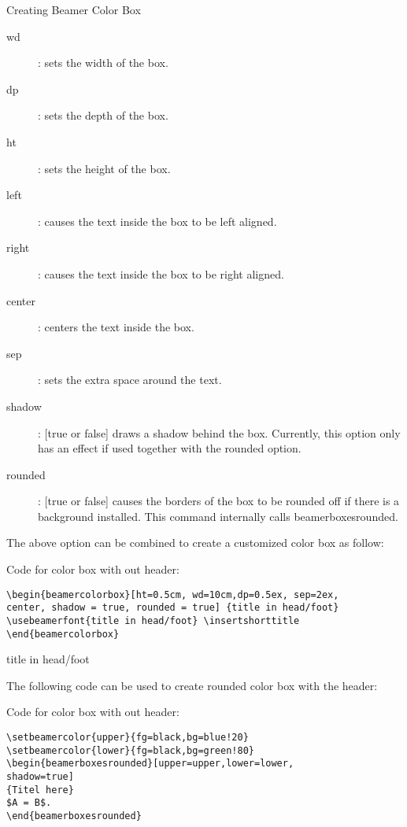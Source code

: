 \documentclass[10pt,xcolor=x11names]{beamer}
\begin{document}
\begin{frame}{Creating Beamer Color Box}
\begin{description}
	\item[wd]: sets the width of the box.
    \item[dp]: sets the depth of the box.
	\item[ht]: sets the height of the box.
	\item[left]: causes the text inside the box to be left aligned.
	\item[right ]: causes the text inside the box to be right aligned.
	\item[center]: centers the text inside the box.
	\item[sep]: sets the extra space around the text.
	\item[shadow]: [true or false] draws a shadow behind the box. Currently, this option only has an effect if used together with the rounded option.
	\item[rounded]: [true or false] causes the borders of the box to be rounded off if there is a background installed. This command internally calls beamerboxesrounded.
\end{description} 
The above option can be combined to create a customized color box as follow: 
\begin{block}{Code for color box with out header:}
\begin{verbatim}
\begin{beamercolorbox}[ht=0.5cm, wd=10cm,dp=0.5ex, sep=2ex, 
center, shadow = true, rounded = true] {title in head/foot}
\usebeamerfont{title in head/foot} \insertshorttitle
\end{beamercolorbox}		
\end{verbatim}
\end{block}

\vspace{10pt}
\begin{beamercolorbox}[ht=1cm,wd=10cm, dp=0.8ex,sep=2ex, center, shadow = true, rounded = true]{title in head/foot}  \insertshorttitle
\end{beamercolorbox}
	
\vspace{95pt}

The following code can be used to create rounded color box with the header:
\begin{block}{Code for color box with out header:}
\begin{verbatim}
\setbeamercolor{upper}{fg=black,bg=blue!20}
\setbeamercolor{lower}{fg=black,bg=green!80}
\begin{beamerboxesrounded}[upper=upper,lower=lower,
shadow=true]
{Titel here}
$A = B$.
\end{beamerboxesrounded}	
\end{verbatim}
\end{block}


\end{frame}
\end{document}
